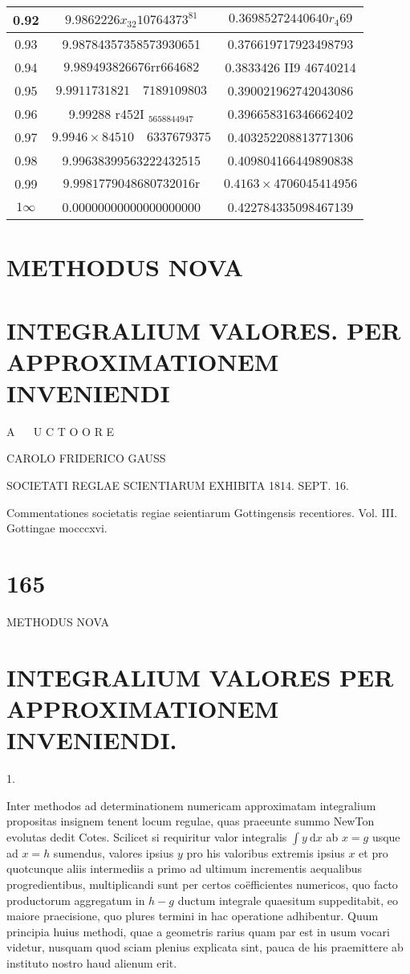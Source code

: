 \documentclass[twoside,12pt, showframe]{memoir}
\begin{document}
\begin{center}
\begin{tabular}{|c|c|c|}
\hline
0.92 & \(9.9862226 x_{32} 10764373^{81}\) & \(0.36985272440640 r_{4} 69\) \\
\hline
0.93 & 9.98784357358573930651 & 0.376619717923498793 \\
\hline
0.94 & \(9.989493826676 \mathrm{rr} 664682\) & 0.3833426 II9 46740214 \\
\hline
0.95 & \(9.9911731821 \quad 7189109803\) & 0.390021962742043086 \\
\hline
0.96 & 9.99288 r452I \(_{5658844947}\) & 0.396658316346662402 \\
\hline
0.97 & \(9.9946 \times 84510 \quad 6337679375\) & 0.403252208813771306 \\
\hline
0.98 & 9.99638399563222432515 & 0.409804166449890838 \\
\hline
0.99 & \(9.9981779048680732016 \mathrm{r}\) & \(0.4163 \times 4706045414956\) \\
\hline
\(1 \infty\) & 0.00000000000000000000 & 0.422784335098467139 \\
\hline
\end{tabular}
\end{center}

\section*{METHODUS NOVA}
\section*{INTEGRALIUM VALORES. 
 PER APPROXIMATIONEM INVENIENDI}
A \(\quad\) U C T O O R E

CAROLO FRIDERICO GAUSS

SOCIETATI REGLAE SCIENTIARUM EXHIBITA 1814. SEPT. 16.

Commentationes societatis regiae seientiarum Gottingensis recentiores. Vol. III. Gottingae mocccxvi.

\section*{165}
METHODUS NOVA

\section*{INTEGRALIUM VALORES 
 PER APPROXIMATIONEM INVENIENDI.}
1.

Inter methodos ad determinationem numericam approximatam integralium propositas insignem tenent locum regulae, quas praeeunte summo NewTon evolutas dedit Cotes. Scilicet si requiritur valor integralis \(\int y \mathrm{~d} x\) ab \(x=g\) usque ad \(x=h\) sumendus, valores ipsius \(y\) pro his valoribus extremis ipsius \(x\) et pro quotcunque aliis intermediis a primo ad ultimum incrementis aequalibus progredientibus, multiplicandi sunt per certos coëfficientes numericos, quo facto productorum aggregatum in \(h-g\) ductum integrale quaesitum suppeditabit, eo maiore praecisione, quo plures termini in hac operatione adhibentur. Quum principia huius methodi, quae a geometris rarius quam par est in usum vocari videtur, nusquam quod sciam plenius explicata sint, pauca de his praemittere ab instituto nostro haud alienum erit.
\end{document}
